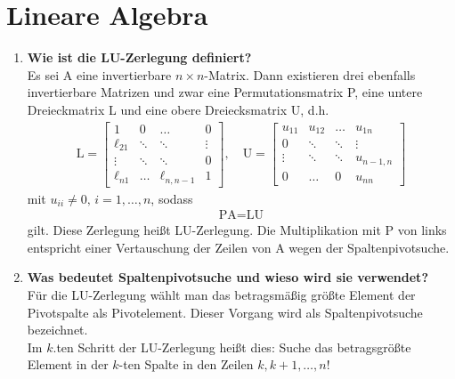 \section{Lineare Algebra}
	\begin{enumerate}
		\item \textbf{Wie ist die LU-Zerlegung definiert?} \\
			Es sei A eine invertierbare \(n\times n\)-Matrix. Dann existieren drei ebenfalls invertierbare Matrizen und zwar eine Permutationsmatrix P, eine untere Dreieckmatrix L und eine obere Dreiecksmatrix U, d.h.
			\begin{align*}
				\text{L} = \begin{bmatrix}
					1 & 0 & \dots & 0 \\
					\ell_{21} & \ddots & \ddots & \vdots \\
					\vdots & \ddots & \ddots & 0 \\
					\ell_{n1} & \dots & \ell_{n,n-1} & 1
				\end{bmatrix}, \quad
				\text{U} = \begin{bmatrix}
					u_{11} & u_{12} & \dots & u_{1n}\\
					0 & \ddots & \ddots & \vdots \\
					\vdots & \ddots & \ddots & u_{n-1,n} \\
					0 & \dots & 0 & u_{nn}
				\end{bmatrix}
			\end{align*}
			mit \(u_{ii}\neq0,\,i=1,\dots,n\), sodass
			\begin{align*}
				\text{PA}=\text{LU}
			\end{align*}
			gilt. Diese Zerlegung heißt LU-Zerlegung. Die Multiplikation mit P von links entspricht einer Vertauschung der Zeilen von A wegen der Spaltenpivotsuche.
		
		\item \textbf{Was bedeutet Spaltenpivotsuche und wieso wird sie verwendet?} \\
			Für die LU-Zerlegung wählt man das betragsmäßig größte Element der Pivotspalte als Pivotelement. Dieser Vorgang wird als Spaltenpivotsuche bezeichnet. \\
			Im \(k\).ten Schritt der LU-Zerlegung heißt dies: Suche das betragsgrößte Element in der \(k\)-ten Spalte in den Zeilen \(k,k+1,\dots,n\)!
		

\end{enumerate}

